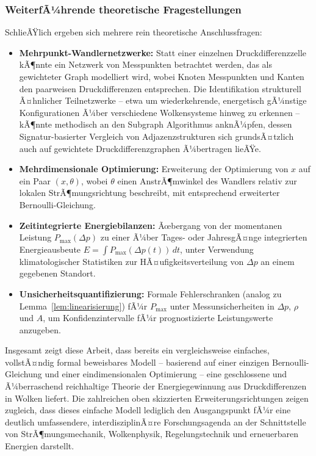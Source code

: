 ﻿\documentclass[a4paper,12pt]{article}
\theoremstyle{definition}
\begin{document}
\subsubsection{WeiterfÃ¼hrende theoretische Fragestellungen}

SchlieÃŸlich ergeben sich mehrere rein theoretische Anschlussfragen:

\begin{itemize}
	\item \textbf{Mehrpunkt-Wandlernetzwerke:} Statt einer einzelnen
	Druckdifferenzzelle kÃ¶nnte ein Netzwerk von Messpunkten betrachtet
	werden, das als gewichteter Graph modelliert wird, wobei Knoten
	Messpunkten und Kanten den paarweisen Druckdifferenzen entsprechen.
	Die Identifikation strukturell Ã¤hnlicher Teilnetzwerke -- etwa um
	wiederkehrende, energetisch gÃ¼nstige Konfigurationen Ã¼ber
	verschiedene Wolkensysteme hinweg zu erkennen -- kÃ¶nnte
	methodisch an den Subgraph Algorithmus anknÃ¼pfen, dessen
	Signatur-basierter Vergleich von Adjazenzstrukturen sich
	grundsÃ¤tzlich auch auf gewichtete Druckdifferenzgraphen Ã¼bertragen
	lieÃŸe.
	\item \textbf{Mehrdimensionale Optimierung:} Erweiterung der
	Optimierung von $x$ auf ein Paar $(x, \theta)$, wobei $\theta$ einen
	AnstrÃ¶mwinkel des Wandlers relativ zur lokalen StrÃ¶mungsrichtung
	beschreibt, mit entsprechend erweiterter Bernoulli-Gleichung.
	\item \textbf{Zeitintegrierte Energiebilanzen:} Ãœbergang von der
	momentanen Leistung $P_{\max}(\Delta p)$ zu einer Ã¼ber Tages- oder
	JahresgÃ¤nge integrierten Energieausbeute $E = \int P_{\max}(\Delta
	p(t))\,dt$, unter Verwendung klimatologischer Statistiken zur
	HÃ¤ufigkeitsverteilung von $\Delta p$ an einem gegebenen Standort.
	\item \textbf{Unsicherheitsquantifizierung:} Formale Fehlerschranken
	(analog zu Lemma~\ref{lem:linearisierung}) fÃ¼r $P_{\max}$ unter
	Messunsicherheiten in $\Delta p$, $\rho$ und $A$, um Konfidenzintervalle
	fÃ¼r prognostizierte Leistungswerte anzugeben.
\end{itemize}

Insgesamt zeigt diese Arbeit, dass bereits ein vergleichsweise einfaches,
vollstÃ¤ndig formal beweisbares Modell -- basierend auf einer einzigen
Bernoulli-Gleichung und einer eindimensionalen Optimierung -- eine
geschlossene und Ã¼berraschend reichhaltige Theorie der Energiegewinnung
aus Druckdifferenzen in Wolken liefert. Die zahlreichen oben skizzierten
Erweiterungsrichtungen zeigen zugleich, dass dieses einfache Modell
lediglich den Ausgangspunkt fÃ¼r eine deutlich umfassendere, interdisziplinÃ¤re
Forschungsagenda an der Schnittstelle von StrÃ¶mungsmechanik,
Wolkenphysik, Regelungstechnik und erneuerbaren Energien darstellt.
\end{document}
